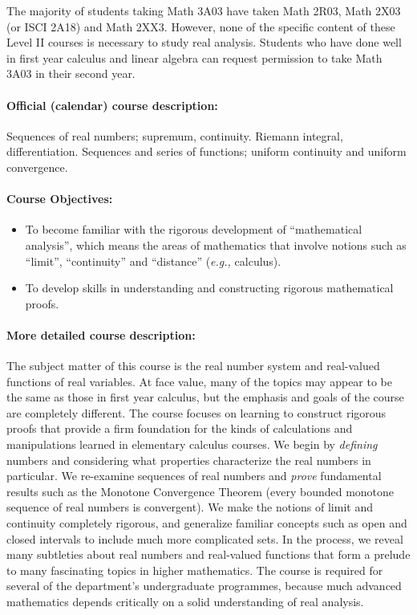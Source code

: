 \documentclass[12pt]{article}
\newcommand{\eg}{\emph{e.g.,\/}\xspace}
\begin{document}
The majority of students taking Math 3A03 have taken Math 2R03, Math 2X03 (or ISCI 2A18) and Math 2XX3.  However, none of the specific content of these Level II courses is necessary to study real analysis.  Students who have done well in first year calculus and linear algebra can request permission to take Math 3A03 in their second year.

\paragraph*{Official (calendar) course description:}
Sequences of real numbers; supremum, continuity. Riemann integral, differentiation. Sequences and series of functions; uniform continuity and uniform convergence.

\paragraph*{Course Objectives:}

\begin{itemize}
\item To become familiar with the rigorous development of ``mathematical analysis'', which means the areas of mathematics that involve notions such as ``limit'', ``continuity'' and ``distance'' (\eg calculus).
\item To develop skills in understanding and constructing rigorous mathematical proofs.
\end{itemize}

\paragraph*{More detailed course description:} 

The subject matter of this course is the real number system and real-valued functions of real variables. At face value, many of the topics may appear to be the same as those in first year calculus, but the emphasis and goals of the course are completely different.  The course focuses on learning to construct rigorous proofs that provide a firm foundation for the kinds of calculations and manipulations learned in elementary calculus courses.  We begin by \emph{defining} numbers and considering what properties characterize the real numbers in particular.  We re-examine sequences of real numbers and \emph{prove} fundamental results such as the Monotone Convergence Theorem (every bounded monotone sequence of real numbers is convergent).  We make the notions of limit and continuity completely rigorous, and generalize familiar concepts such as open and closed intervals to include much more complicated sets.  In the process, we reveal many subtleties about real numbers and real-valued functions that form a prelude to many fascinating topics in higher mathematics.  The course is required for several of the department's undergraduate programmes, because much advanced mathematics depends critically on a solid understanding of real analysis.
\end{document}

